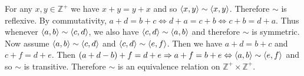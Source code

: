 \documentclass[12pt]{book}
\begin{document}
\begin{enumerate}
{For any $x,y\in\mathbb{Z}^+$ we have $x+y=y+x$ and so $\langle x,y\rangle\sim\langle x,y\rangle$. Therefore $\sim$ is reflexive. By commutativity, $a+d=b+c \iff d+a=c+b \iff c+b=d+a$. Thus whenever $\langle a,b\rangle\sim\langle c,d\rangle$, we also have $\langle c,d\rangle\sim\langle a,b\rangle$ and therefore $\sim$ is symmetric. Now assume $\langle a,b\rangle\sim\langle c,d\rangle$ and $\langle c,d\rangle\sim\langle e,f\rangle$. Then we have $a+d=b+c$ and $c+f=d+e$. Then $(a+d-b)+f=d+e \Rightarrow a+f=b+e \Leftrightarrow \langle a,b\rangle\sim\langle e,f\rangle$ and so $\sim$ is transitive. Therefore $\sim$ is an equivalence relation on $\mathbb{Z}^+\times\mathbb{Z}^+$.}

\end{enumerate}

\hrulefill
\end{document}
